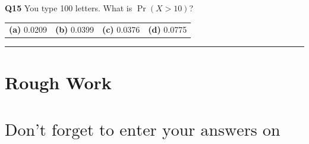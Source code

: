 \documentclass[12pt]{article}
\begin{document}
{\bf Q15} You type 100 letters. What is $\Pr(X > 10)$? \\[0.2cm]
\begin{tabular}{cccc}
{\bf(a)} 0.0209 & {\bf(b)} 0.0399 & {\bf(c)} 0.0376 & {\bf(d)} 0.0775 \\[0.6cm]
\end{tabular}

\rule{\linewidth}{1pt}








\newpage

\section*{Rough Work\\[23cm]}
\section*{\hspace{2cm}$\boxed{\text{Don't forget to enter your answers on the last page!}}$}

\newpage
\end{document}
